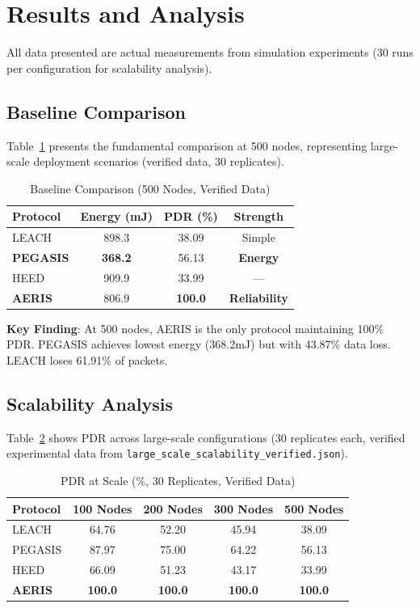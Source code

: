 \documentclass[twocolumn]{article}
\begin{document}
\section{Results and Analysis}
\label{sec:results}

All data presented are actual measurements from simulation experiments
(30 runs per configuration for scalability analysis).

\subsection{Baseline Comparison}

Table~\ref{tab:baseline} presents the fundamental comparison at 500 nodes,
representing large-scale deployment scenarios (verified data, 30 replicates).

\begin{table}[htbp]
\centering
\caption{Baseline Comparison (500 Nodes, Verified Data)}
\label{tab:baseline}
\begin{tabular}{@{}lccc@{}}
\toprule
Protocol & Energy (mJ) & PDR (\%) & Strength \\
\midrule
LEACH & 898.3 & 38.09 & Simple \\
\textbf{PEGASIS} & \textbf{368.2} & 56.13 & \textbf{Energy} \\
HEED & 909.9 & 33.99 & --- \\
\textbf{AERIS} & 806.9 & \textbf{100.0} & \textbf{Reliability} \\
\bottomrule
\end{tabular}
\end{table}

\textbf{Key Finding}: At 500 nodes, AERIS is the only protocol maintaining
100\% PDR. PEGASIS achieves lowest energy (368.2mJ) but with 43.87\% data
loss. LEACH loses 61.91\% of packets.

\subsection{Scalability Analysis}

Table~\ref{tab:scalability} shows PDR across large-scale configurations
(30 replicates each, verified experimental data from \texttt{large\_scale\_scalability\_verified.json}).

\begin{table}[htbp]
\centering
\caption{PDR at Scale (\%, 30 Replicates, Verified Data)}
\label{tab:scalability}
\begin{tabular}{@{}lcccc@{}}
\toprule
Protocol & 100 Nodes & 200 Nodes & 300 Nodes & 500 Nodes \\
\midrule
LEACH & 64.76 & 52.20 & 45.94 & 38.09 \\
PEGASIS & 87.97 & 75.00 & 64.22 & 56.13 \\
HEED & 66.09 & 51.23 & 43.17 & 33.99 \\
\textbf{AERIS} & \textbf{100.0} & \textbf{100.0} & \textbf{100.0} & \textbf{100.0} \\
\bottomrule
\end{tabular}
\end{table}
\end{document}
